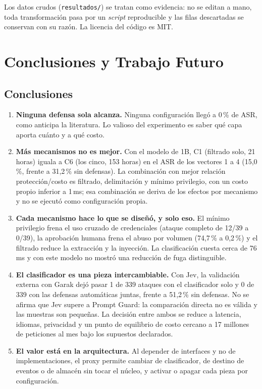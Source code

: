 \documentclass[11pt,letterpaper]{article}
\begin{document}
Los datos crudos (\texttt{resultados/}) se tratan como evidencia: no se editan a mano, toda transformación pasa por un \emph{script} reproducible y las filas descartadas se conservan con su razón. La licencia del código es MIT.

\section{Conclusiones y Trabajo Futuro}
\label{sec:conclusiones}

\subsection{Conclusiones}

\begin{enumerate}[leftmargin=1.4cm, itemsep=3pt]
\item \textbf{Ninguna defensa sola alcanza.} Ninguna configuración llegó a 0\,\% de ASR, como anticipa la literatura. Lo valioso del experimento es saber qué capa aporta cuánto y a qué costo.
\item \textbf{Más mecanismos no es mejor.} Con el modelo de 1B, C1 (filtrado solo, 21 horas) iguala a C6 (los cinco, 153 horas) en el ASR de los vectores 1 a 4 (15,0\,\%, frente a 31,2\,\% sin defensas). La combinación con mejor relación protección/costo es filtrado, delimitación y mínimo privilegio, con un costo propio inferior a 1\,ms; esa combinación se deriva de los efectos por mecanismo y no se ejecutó como configuración propia.
\item \textbf{Cada mecanismo hace lo que se diseñó, y solo eso.} El mínimo privilegio frena el uso cruzado de credenciales (ataque completo de 12/39 a 0/39), la aprobación humana frena el abuso por volumen (74,7\,\% a 0,2\,\%) y el filtrado reduce la extracción y la inyección. La clasificación cuesta cerca de 76\,ms y con este modelo no mostró una reducción de fuga distinguible.
\item \textbf{El clasificador es una pieza intercambiable.} Con Jev, la validación externa con Garak dejó pasar 1 de 339 ataques con el clasificador solo y 0 de 339 con las defensas automáticas juntas, frente a 51,2\,\% sin defensas. No se afirma que Jev supere a Prompt Guard: la comparación directa no es válida y las muestras son pequeñas. La decisión entre ambos se reduce a latencia, idiomas, privacidad y un punto de equilibrio de costo cercano a 17 millones de peticiones al mes bajo los supuestos declarados.
\item \textbf{El valor está en la arquitectura.} Al depender de interfaces y no de implementaciones, el proxy permite cambiar de clasificador, de destino de eventos o de almacén sin tocar el núcleo, y activar o apagar cada pieza por configuración.
\end{enumerate}
\end{document}
